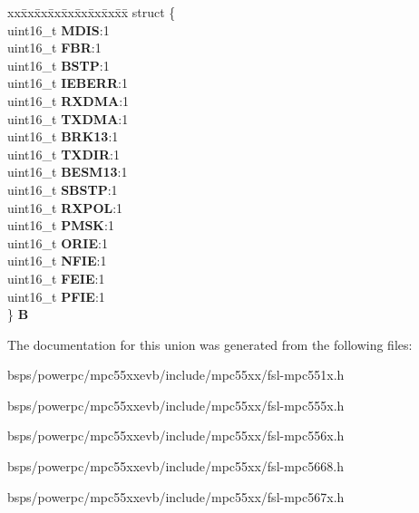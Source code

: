 \begin{DoxyCompactItemize}
\begin{tabbing}
\end{tabbing}\item 
\mbox{\label{unionESCI__tag_1_1ESCI__CR2__tag_a6de31c549a36f3e7de88a9830505f254}} 
\begin{tabbing}
xx\=xx\=xx\=xx\=xx\=xx\=xx\=xx\=xx\=\kill
struct \{\\
\>uint16\_t {\bfseries MDIS}:1\\
\>uint16\_t {\bfseries FBR}:1\\
\>uint16\_t {\bfseries BSTP}:1\\
\>uint16\_t {\bfseries IEBERR}:1\\
\>uint16\_t {\bfseries RXDMA}:1\\
\>uint16\_t {\bfseries TXDMA}:1\\
\>uint16\_t {\bfseries BRK13}:1\\
\>uint16\_t {\bfseries TXDIR}:1\\
\>uint16\_t {\bfseries BESM13}:1\\
\>uint16\_t {\bfseries SBSTP}:1\\
\>uint16\_t {\bfseries RXPOL}:1\\
\>uint16\_t {\bfseries PMSK}:1\\
\>uint16\_t {\bfseries ORIE}:1\\
\>uint16\_t {\bfseries NFIE}:1\\
\>uint16\_t {\bfseries FEIE}:1\\
\>uint16\_t {\bfseries PFIE}:1\\
\} {\bfseries B}\\

\end{tabbing}\end{DoxyCompactItemize}


The documentation for this union was generated from the following files\+:\begin{DoxyCompactItemize}
\item 
bsps/powerpc/mpc55xxevb/include/mpc55xx/fsl-\/mpc551x.\+h\item 
bsps/powerpc/mpc55xxevb/include/mpc55xx/fsl-\/mpc555x.\+h\item 
bsps/powerpc/mpc55xxevb/include/mpc55xx/fsl-\/mpc556x.\+h\item 
bsps/powerpc/mpc55xxevb/include/mpc55xx/fsl-\/mpc5668.\+h\item 
bsps/powerpc/mpc55xxevb/include/mpc55xx/fsl-\/mpc567x.\+h\end{DoxyCompactItemize}
